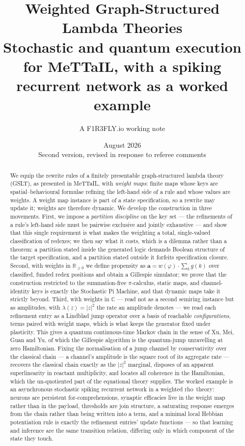 \documentclass[11pt,a4paper]{article}
\title{\textbf{Weighted Graph-Structured Lambda Theories}\\[0.4em]
\large Stochastic and quantum execution for MeTTaIL, with a spiking\\
recurrent network as a worked example}
\author{A F1R3FLY.io working note}
\date{August 2026 \\[0.2em]\small Second version, revised in response to referee comments}
\theoremstyle{plain}
\theoremstyle{definition}
\theoremstyle{remark}
\newcommand{\rhoc}{\textsf{rho}}
\newcommand{\Rnn}{\mathbb{R}_{\geq 0}}
\newcommand{\Cx}{\mathbb{C}}
\newcommand{\prop}{\mathbf{a}}
\newcommand{\wmap}{w}
\newcommand{\gfac}{g}
\begin{document}
\maketitle

\begin{abstract}
We equip the rewrite rules of a finitely presentable graph-structured lambda theory (GSLT), as
presented in MeTTaIL, with \emph{weight maps}: finite maps whose keys are spatial--behavioural
formulae refining the left-hand side of a rule and whose values are weights. A weight map instance
is part of a state specification, so a rewrite may update it; weights are therefore dynamic. We
develop the construction in three movements. First, we impose a \emph{partition discipline} on the
key set --- the refinements of a rule's left-hand side must be pairwise exclusive and jointly
exhaustive --- and show that this single requirement is what makes the weighting a total,
single-valued classification of redexes; we then say what it costs, which is a dilemma rather than a
theorem: a partition stated inside the generated logic demands Boolean structure of the target
specification, and a partition stated outside it forfeits specification closure. Second, with
weights in $\Rnn$ we define propensity as $\prop = \wmap(\varphi)\cdot\sum_k \gfac(k)$ over
classified, funded redex positions and obtain a Gillespie simulator; we prove that the construction
restricted to the summation-free $\pi$-calculus, static maps, and channel-identity keys is exactly
the Stochastic Pi Machine, and that dynamic maps take it strictly beyond. Third, with weights in
$\Cx$ --- read not as a second semiring instance but as amplitudes, with $\lambda(z) = |z|^2$ the
rate an amplitude denotes --- we read each refinement entry as a Lindblad jump operator over a basis
of reachable \emph{configurations}, terms paired with weight maps, which is what keeps the generator
fixed under plasticity. This gives a quantum continuous-time Markov chain in the sense of Xu, Mei,
Guan and Yu, of which the Gillespie algorithm is the quantum-jump unravelling at zero Hamiltonian.
Fixing the normalisation of a jump channel by conservativity over the classical chain --- a channel's
amplitude is the square root of its aggregate rate --- recovers the classical chain exactly as the
$|z|^2$ marginal, disposes of an apparent superlinearity in reactant multiplicity, and locates all
coherence in the Hamiltonian, which the un-quotiented part of the equational theory supplies. The
worked example is an asynchronous stochastic spiking recurrent network in a weighted \rhoc\ theory:
neurons are persistent for-comprehensions, synaptic efficacies live in the weight map rather than in
the payload, thresholds are join structure, a saturating response emerges from the chain rather than
being written into a term, and a minimal local Hebbian potentiation rule is exactly the refinement
entries' update functions --- so that learning and inference are the same transition relation,
differing only in which component of the state they touch.
\end{abstract}
\end{document}
